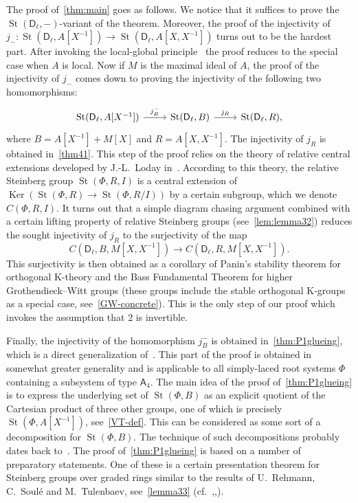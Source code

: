 \documentclass[10pt,a4paper,twoside]{article}
\theoremstyle{remark}
\theoremstyle{definition}
\numberwithin{lemma}{section}
\numberwithin{prop}{section}
\numberwithin{corollary}{section}
\numberwithin{externaltheorem}{section}
\DeclareMathOperator{\Ker}{Ker}
\DeclareMathOperator{\St}{St}
\newcommand{\inv}{^{-1}}
\newcommand{\rA}{\mathsf{A}}
\newcommand{\rD}{\mathsf{D}}
\numberwithin{equation}{section}
\begin{document}
The proof of~\cref{thm:main} goes as follows. We notice that it suffices to prove the $\St(\rD_\ell, -)$-variant of the theorem. Moreover, the proof of the injectivity of
$j_- \colon \St(\rD_\ell, A[X\inv]) \to \St(\rD_\ell, A[X, X\inv])$ turns out to be the hardest part. After invoking the local-global principle~\cite[Theorem~2]{LS17} the proof reduces to the special case when $A$ is local.
Now if $M$ is the maximal ideal of $A$, the proof of the injectivity of $j_-$ comes down to proving the injectivity of the following two homomorphisms:
\[\begin{tikzcd} \St(\rD_\ell, A[X^{-1}]) \arrow{r}{j_B^-} & \St(\rD_\ell, B) \arrow{r}{j_R} & \St(\rD_\ell, R), \end{tikzcd} \]
where $B = A[X\inv] + M[X]$ and $R = A[X, X\inv]$.
The injectivity of $j_R$ is obtained in~\cref{thm41}. This step of the proof relies on the theory of relative central extensions developed by J.-L.~Loday in~\cite{Lo78}. According to this theory, the relative Steinberg group $\St(\Phi, R, I)$ is a central extension of $\Ker(\St(\Phi, R) \to \St(\Phi, R/I))$ by a certain subgroup, which we denote $C(\Phi, R, I)$. It turns out that a simple diagram chasing argument combined with a certain lifting property of relative Steinberg groups (see~\cref{lem:lemma32}) reduces the sought injectivity of $j_R$ to the surjectivity of the map \[C(\rD_\ell, B, M[X, X\inv]) \to C(\rD_\ell, R, M[X, X\inv]).\] This surjectivity is then obtained as a corollary of Panin's stability theorem for orthogonal K-theory and the Bass Fundamental Theorem for higher Grothendieck--Witt groups (these groups include the stable orthogonal K-groups as a special case, see~\eqref{GW-concrete}). This is the only step of our proof which invokes the assumption that $2$ is invertible. 

Finally, the injectivity of the homomorphism $j_B^-$ is obtained in~\cref{thm:P1glueing}, which is a direct generalization of~\cite[Proposition~4.3]{Tu83}. This part of the proof is obtained in somewhat greater generality and is applicable to all simply-laced root systems $\Phi$ containing a subsystem of type $\rA_4$. The main idea of the proof of~\cref{thm:P1glueing} is to express the underlying set of $\St(\Phi, B)$ as an explicit quotient of the Cartesian product of three other groups, one of which is precisely $\St(\Phi, A[X\inv])$, see~\eqref{VT-def}. This can be considered as some sort of a decomposition for $\St(\Phi, B)$. The technique of such decompositions probably dates back to~\cite{ST76}.
The proof of~\cref{thm:P1glueing} is based on a number of preparatory statements. One of these is a certain presentation theorem for Steinberg groups over graded rings similar to the results of U.~Rehmann, C.~Soul{\'e} and M.~Tulenbaev, see~\cref{lemma33} (cf.~\cite[Satz~2]{Re75},\cite[Theorem~2]{RS76},\cite[Lemma~3.3]{Tu83}).
\end{document}
